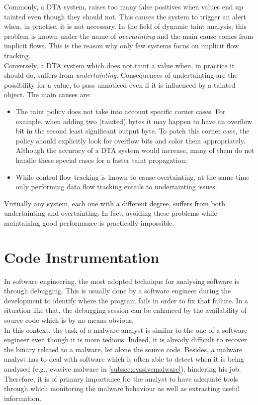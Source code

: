 \documentclass[LaM,binding=0.6cm]{sapthesis}
\begin{document}
Commonly, a DTA system, raises too many false positives when values end up tainted even though they should not. This causes the system to trigger an alert when, in practise, it is not necessary. In the field of dynamic taint analysis, this problem is known under the name of \textit{overtainting} and the main cause comes from implicit flows. This is the reason why only few systems focus on implicit flow tracking.\\
Conversely, a DTA system which does not taint a value when, in practice it should do, suffers from \textit{undertainting}. Consequences of undertainting are the possibility for a value, to pass unnoticed even if it is influenced by a tainted object. The main causes are:
\begin{itemize}
\item The taint policy does not take into account specific corner cases. For example, when adding two (tainted) bytes it may happen to have an overflow bit in the second least significant output byte. To patch this corner case, the policy should explicitly look for overflow bits and color them appropriately. Although the accuracy of a DTA system would increase, many of them do not handle these special cases for a faster taint propagation;
\item While control flow tracking is known to cause overtainting, at the same time only performing data flow tracking entails to undertainting issues.
\end{itemize}
Virtually any system, each one with a different degree, suffers from both undertainting and overtainting. In fact, avoiding these problems while maintaining good performance is practically impossible.
\section{Code Instrumentation}
In software engineering, the most adopted technique for analysing software is through debugging. This is usually done by a software engineer during the development to identify where the program fails in order to fix that failure. In a situation like that, the debugging session can be enhanced by the availability of source code which is by no means obvious.\\
In this context, the task of a malware analyst is similar to the one of a software engineer even though it is more tedious. Indeed, it is already difficult to recover the binary related to a malware, let alone the source code. Besides, a malware analyst has to deal with software which is often able to detect when it is being analysed (e.g., evasive malware in \autoref{subsec:evasivemalware}), hindering his job. Therefore, it is of primary importance for the analyst to have adequate tools through which monitoring the malware behaviour as well as extracting useful information.\\ 
\end{document}
